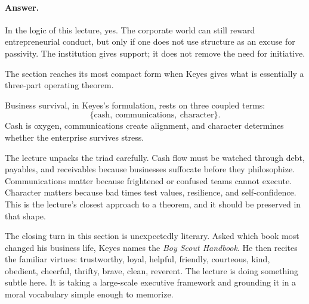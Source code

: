 \paragraph{Answer.} In the logic of this lecture, yes. The corporate world can still reward entrepreneurial conduct, but only if one does not use structure as an excuse for passivity. The institution gives support; it does not remove the need for initiative.

The section reaches its most compact form when Keyes gives what is essentially a three-part operating theorem.

\begin{proposition}
Business survival, in Keyes's formulation, rests on three coupled terms:
\begin{equation}
\{\text{cash},\ \text{communications},\ \text{character}\}.
\end{equation}
Cash is oxygen, communications create alignment, and character determines whether the enterprise survives stress.
\end{proposition}

\begin{figure}
\begin{center}
\end{center}
\end{figure}

The lecture unpacks the triad carefully. Cash flow must be watched through debt, payables, and receivables because businesses suffocate before they philosophize. Communications matter because frightened or confused teams cannot execute. Character matters because bad times test values, resilience, and self-confidence. This is the lecture's closest approach to a theorem, and it should be preserved in that shape.

The closing turn in this section is unexpectedly literary. Asked which book most changed his business life, Keyes names the \emph{Boy Scout Handbook}. He then recites the familiar virtues: trustworthy, loyal, helpful, friendly, courteous, kind, obedient, cheerful, thrifty, brave, clean, reverent. The lecture is doing something subtle here. It is taking a large-scale executive framework and grounding it in a moral vocabulary simple enough to memorize.


